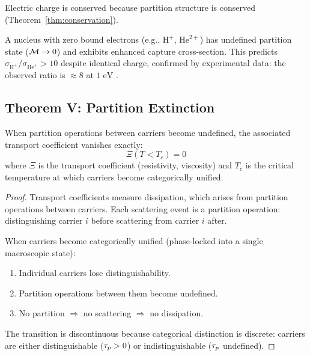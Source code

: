\begin{corollary}
\label{cor:charge_conservation}
Electric charge is conserved because partition structure is conserved (Theorem~\ref{thm:conservation}).
\end{corollary}

\begin{corollary}
\label{cor:bare_nucleus}
A nucleus with zero bound electrons (e.g., $\mathrm{H}^+$, $\mathrm{He}^{2+}$) has undefined partition state ($\mathcal{M} \to 0$) and exhibits enhanced capture cross-section. This predicts $\sigma_{\mathrm{H}^+}/\sigma_{\mathrm{He}^+} > 10$ despite identical charge, confirmed by experimental data: the observed ratio is $\approx 8$ at $1\;\mathrm{eV}$ \cite{janev1987}.
\end{corollary}

\subsection{Theorem V: Partition Extinction}

\begin{theorem}
\label{thm:extinction}
When partition operations between carriers become undefined, the associated transport coefficient vanishes exactly:
\begin{equation}
    \Xi(T < T_c) = 0
\end{equation}
where $\Xi$ is the transport coefficient (resistivity, viscosity) and $T_c$ is the critical temperature at which carriers become categorically unified.
\end{theorem}

\begin{proof}
Transport coefficients measure dissipation, which arises from partition operations between carriers. Each scattering event is a partition operation: distinguishing carrier $i$ before scattering from carrier $i$ after.

When carriers become categorically unified (phase-locked into a single macroscopic state):
\begin{enumerate}
    \item Individual carriers lose distinguishability.
    \item Partition operations between them become undefined.
    \item No partition $\Rightarrow$ no scattering $\Rightarrow$ no dissipation.
\end{enumerate}
The transition is discontinuous because categorical distinction is discrete: carriers are either distinguishable ($\tau_p > 0$) or indistinguishable ($\tau_p$ undefined).
\end{proof}

